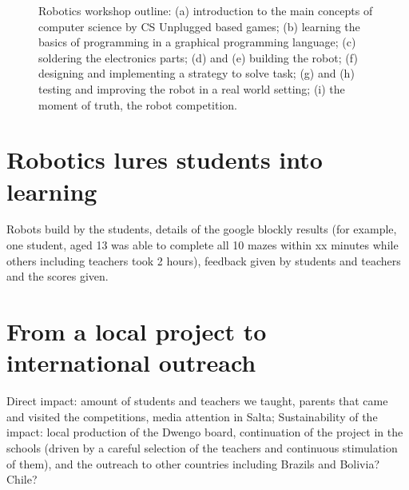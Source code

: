 \documentclass[a4paper]{llncs}
\begin{document}
\begin{figure}[htp]
\caption[]{Robotics workshop outline: (a) introduction to the main concepts of computer science by CS Unplugged based games; (b) learning the basics of programming in a graphical programming language; (c) soldering the electronics parts; (d) and (e) building the robot; (f) designing and implementing a strategy to solve task; (g) and (h) testing and improving the robot in a real world setting; (i) the moment of truth, the robot competition.}
\end{figure}

\section{Robotics lures students into learning}
Robots build by the students, details of the google blockly results (for example, one student, aged 13 was able to complete all 10 mazes within xx minutes while others including teachers took 2 hours), feedback given by students and teachers and the scores given.

\section{From a local project to international outreach}
Direct impact: amount of students and teachers we taught, parents that came and visited the competitions, media attention in Salta; Sustainability of the impact: local production of the Dwengo board, continuation of the project in the schools (driven by a careful selection of the teachers and continuous stimulation of them), and the outreach to other countries including Brazils and Bolivia? Chile?
\end{document}
